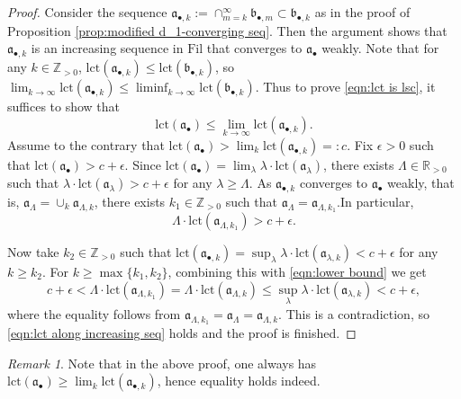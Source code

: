 \documentclass[11pt, leqno]{amsart}%
\theoremstyle{plain}
\theoremstyle{definition}
\theoremstyle{remark}
\newtheorem{remark}[theorem]{Remark}
\newcommand{\bR}{\mathbb{R}}
\newcommand{\bZ}{\mathbb{Z}}
\newcommand{\fa}{\mathfrak{a}}
\newcommand{\fb}{\mathfrak{b}}
\newcommand{\lct}{\mathrm{lct}}
\newcommand{\Fil}{\mathrm{Fil}}
\numberwithin{equation}{section}
\begin{document}
\begin{proof}
    
	
    Consider the sequence $\fa_{\bullet,k}:=\cap_{m=k}^\infty \fb_{\bullet,m}\subset\fb_{\bullet,k}$ as in the proof of Proposition \ref{prop:modified d_1-converging seq}. Then the argument shows that $\fa_{\bullet,k}$ is an increasing sequence in $\Fil$ that converges to $\fa_\bullet$ weakly. Note that for any $k\in\bZ_{>0}$, $\lct(\fa_{\bullet,k})\le \lct(\fb_{\bullet,k})$, so $\lim_{k\to\infty} \lct(\fa_{\bullet,k})\le \liminf_{k\to\infty}\lct(\fb_{\bullet,k})$. Thus to prove \eqref{eqn:lct is lsc}, it suffices to show that 
    \begin{equation}\label{eqn:lct along increasing seq}
        \lct(\fa_\bullet)\le \lim_{k\to\infty}\lct(\fa_{\bullet,k}).
    \end{equation}
    Assume to the contrary that $\lct(\fa_\bullet)>\lim_k\lct(\fa_{\bullet,k})=:c$. Fix $\epsilon>0$ such that $\lct(\fa_\bullet)>c+\epsilon$. Since $\lct(\fa_\bullet)=\lim_\lambda \lambda\cdot\lct(\fa_\lambda)$, there exists $\Lambda\in\bR_{>0}$ such that $\lambda\cdot\lct(\fa_\lambda)>c+\epsilon$ for any $\lambda\ge\Lambda$. As $\fa_{\bullet,k}$ converges to $\fa_\bullet$ weakly, that is, $\fa_\Lambda=\cup_k \fa_{\Lambda,k}$, there exists $k_1\in\bZ_{>0}$ such that $\fa_\Lambda=\fa_{\Lambda,k_1}$.In particular, 
    \begin{equation}\label{eqn:lower bound}
        \Lambda\cdot\lct(\fa_{\Lambda,k_1})>c+\epsilon.
    \end{equation}  
	
    Now take $k_2\in\bZ_{>0}$ such that $\lct(\fa_{\bullet,k})=\sup_\lambda \lambda\cdot\lct(\fa_{\lambda,k})<c+\epsilon$ for any $k\ge k_2$. For $k\ge\max\{k_1,k_2\}$, combining this with \eqref{eqn:lower bound} we get
    \[
        c+\epsilon<\Lambda\cdot\lct(\fa_{\Lambda,k_1})
        =\Lambda\cdot\lct(\fa_{\Lambda,k})
        \le\sup_\lambda\lambda\cdot\lct(\fa_{\lambda,k})<c+\epsilon,
    \]
    where the equality follows from $\fa_{\Lambda,k_1}=\fa_\Lambda=\fa_{\Lambda,k}$. This is a contradiction, so \eqref{eqn:lct along increasing seq} holds and the proof is finished. 
\end{proof}

\begin{remark}
    Note that in the above proof, one always has $\lct(\fa_\bullet)\ge \lim_k\lct(\fa_{\bullet,k})$, hence equality holds indeed.
\end{remark}
\end{document}
